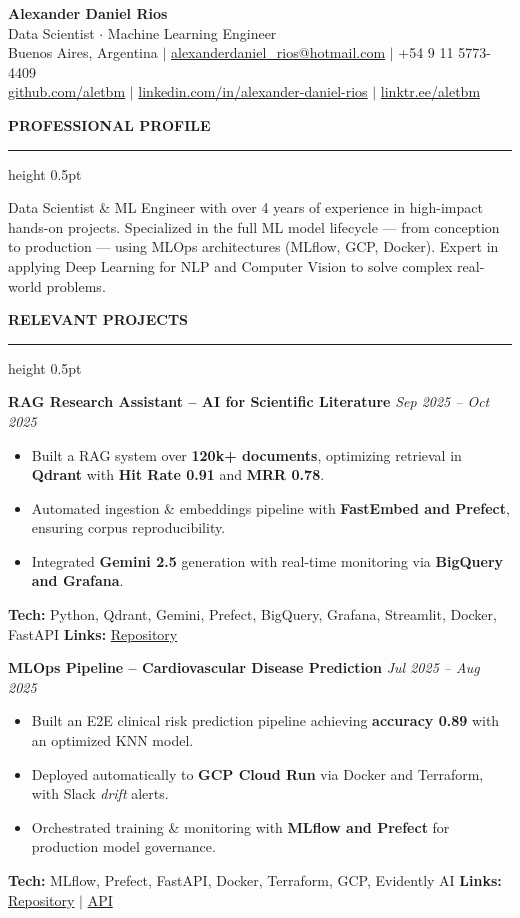 \documentclass[10pt]{extarticle}
\newcommand{\cvsection}[1]{%
  \vspace{6pt}%
  {\small\bfseries\uppercase{#1}}%
  \vspace{2pt}\hrule height 0.5pt\vspace{5pt}%
}
\newcommand{\project}[5]{%
  \textbf{#1} \hfill \textit{\small #2}\\[-14pt]
  \begin{itemize}[leftmargin=1.2em, itemsep=0pt, topsep=2pt, parsep=0pt]
    #3
  \end{itemize}
  \vspace{1pt}
  {\small\textbf{Tech:} #4 \quad \textbf{Links:} #5}
  \vspace{5pt}%
}
\begin{document}
\begin{center}
  {\LARGE\bfseries Alexander Daniel Rios}\\[4pt]
  {\small
    Data Scientist \(\cdot\) Machine Learning Engineer\\[3pt]
    Buenos Aires, Argentina
    \(\mid\) \href{mailto:alexanderdaniel_rios@hotmail.com}{alexanderdaniel\_rios@hotmail.com}
    \(\mid\) +54 9 11 5773-4409\\[2pt]
    \href{https://github.com/aletbm}{github.com/aletbm}
    \(\mid\) \href{https://www.linkedin.com/in/alexander-daniel-rios}{linkedin.com/in/alexander-daniel-rios}
    \(\mid\) \href{https://www.linktr.ee/aletbm}{linktr.ee/aletbm}
  }
\end{center}

\vspace{2pt}

\cvsection{Professional Profile}

Data Scientist \& ML Engineer with over 4 years of experience in high-impact hands-on projects.
Specialized in the full ML model lifecycle — from conception to production — using MLOps
architectures (MLflow, GCP, Docker). Expert in applying Deep Learning for NLP and Computer Vision
to solve complex real-world problems.

\cvsection{Relevant Projects}

\project
  {RAG Research Assistant – AI for Scientific Literature}
  {Sep 2025 – Oct 2025}
  {
    \item Built a RAG system over \textbf{120k+ documents}, optimizing retrieval in \textbf{Qdrant} with \textbf{Hit Rate 0.91} and \textbf{MRR 0.78}.
    \item Automated ingestion \& embeddings pipeline with \textbf{FastEmbed and Prefect}, ensuring corpus reproducibility.
    \item Integrated \textbf{Gemini 2.5} generation with real-time monitoring via \textbf{BigQuery and Grafana}.
  }
  {Python, Qdrant, Gemini, Prefect, BigQuery, Grafana, Streamlit, Docker, FastAPI}
  {\href{https://github.com/aletbm/RAG_Research_Assistant}{Repository}}

\project
  {MLOps Pipeline – Cardiovascular Disease Prediction}
  {Jul 2025 – Aug 2025}
  {
    \item Built an E2E clinical risk prediction pipeline achieving \textbf{accuracy 0.89} with an optimized KNN model.
    \item Deployed automatically to \textbf{GCP Cloud Run} via Docker and Terraform, with Slack \textit{drift} alerts.
    \item Orchestrated training \& monitoring with \textbf{MLflow and Prefect} for production model governance.
  }
  {MLflow, Prefect, FastAPI, Docker, Terraform, GCP, Evidently AI}
  {\href{https://github.com/aletbm/Cardiovascular-Diseases_E2E_MLPipeline}{Repository} \(\mid\) \href{https://cardiovascular-diseases-api-761922006747.us-east1.run.app}{API}}
\end{document}
